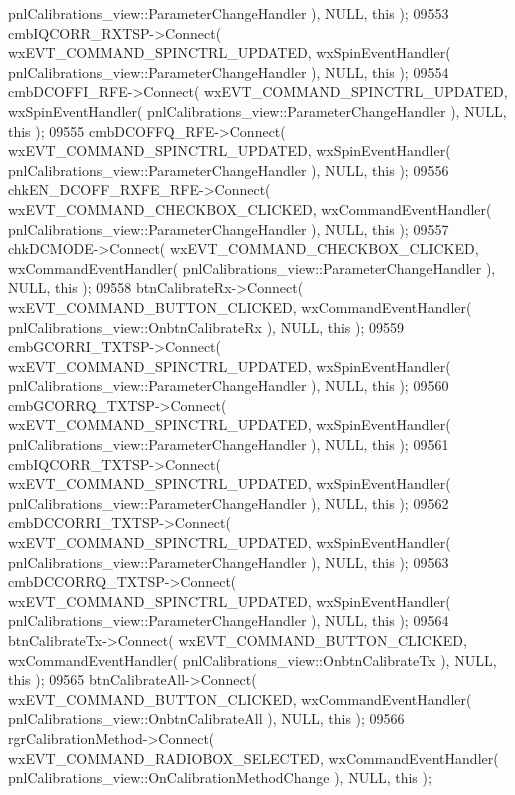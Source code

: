 \begin{DoxyCode}
      pnlCalibrations_view::ParameterChangeHandler ), NULL, \textcolor{keyword}{this} );
09553     cmbIQCORR_RXTSP->Connect( wxEVT\_COMMAND\_SPINCTRL\_UPDATED, wxSpinEventHandler( 
      pnlCalibrations_view::ParameterChangeHandler ), NULL, \textcolor{keyword}{this} );
09554     cmbDCOFFI_RFE->Connect( wxEVT\_COMMAND\_SPINCTRL\_UPDATED, wxSpinEventHandler( 
      pnlCalibrations_view::ParameterChangeHandler ), NULL, \textcolor{keyword}{this} );
09555     cmbDCOFFQ_RFE->Connect( wxEVT\_COMMAND\_SPINCTRL\_UPDATED, wxSpinEventHandler( 
      pnlCalibrations_view::ParameterChangeHandler ), NULL, \textcolor{keyword}{this} );
09556     chkEN_DCOFF_RXFE_RFE->Connect( wxEVT\_COMMAND\_CHECKBOX\_CLICKED, wxCommandEventHandler( 
      pnlCalibrations_view::ParameterChangeHandler ), NULL, \textcolor{keyword}{this} );
09557     chkDCMODE->Connect( wxEVT\_COMMAND\_CHECKBOX\_CLICKED, wxCommandEventHandler( 
      pnlCalibrations_view::ParameterChangeHandler ), NULL, \textcolor{keyword}{this} );
09558     btnCalibrateRx->Connect( wxEVT\_COMMAND\_BUTTON\_CLICKED, wxCommandEventHandler( 
      pnlCalibrations_view::OnbtnCalibrateRx ), NULL, \textcolor{keyword}{this} );
09559     cmbGCORRI_TXTSP->Connect( wxEVT\_COMMAND\_SPINCTRL\_UPDATED, wxSpinEventHandler( 
      pnlCalibrations_view::ParameterChangeHandler ), NULL, \textcolor{keyword}{this} );
09560     cmbGCORRQ_TXTSP->Connect( wxEVT\_COMMAND\_SPINCTRL\_UPDATED, wxSpinEventHandler( 
      pnlCalibrations_view::ParameterChangeHandler ), NULL, \textcolor{keyword}{this} );
09561     cmbIQCORR_TXTSP->Connect( wxEVT\_COMMAND\_SPINCTRL\_UPDATED, wxSpinEventHandler( 
      pnlCalibrations_view::ParameterChangeHandler ), NULL, \textcolor{keyword}{this} );
09562     cmbDCCORRI_TXTSP->Connect( wxEVT\_COMMAND\_SPINCTRL\_UPDATED, wxSpinEventHandler( 
      pnlCalibrations_view::ParameterChangeHandler ), NULL, \textcolor{keyword}{this} );
09563     cmbDCCORRQ_TXTSP->Connect( wxEVT\_COMMAND\_SPINCTRL\_UPDATED, wxSpinEventHandler( 
      pnlCalibrations_view::ParameterChangeHandler ), NULL, \textcolor{keyword}{this} );
09564     btnCalibrateTx->Connect( wxEVT\_COMMAND\_BUTTON\_CLICKED, wxCommandEventHandler( 
      pnlCalibrations_view::OnbtnCalibrateTx ), NULL, \textcolor{keyword}{this} );
09565     btnCalibrateAll->Connect( wxEVT\_COMMAND\_BUTTON\_CLICKED, wxCommandEventHandler( 
      pnlCalibrations_view::OnbtnCalibrateAll ), NULL, \textcolor{keyword}{this} );
09566     rgrCalibrationMethod->Connect( wxEVT\_COMMAND\_RADIOBOX\_SELECTED, wxCommandEventHandler( 
      pnlCalibrations_view::OnCalibrationMethodChange ), NULL, \textcolor{keyword}{this} );

\end{DoxyCode}
